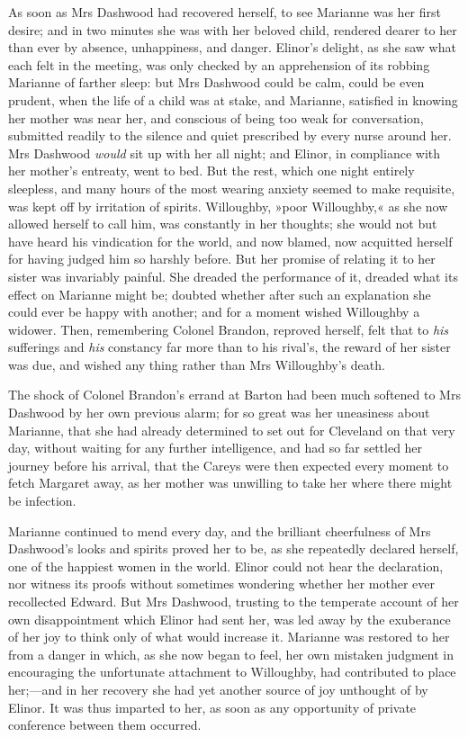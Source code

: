 As soon as Mrs Dashwood had recovered herself, to see Marianne was her first desire; and in two minutes she was with her beloved child, rendered dearer to her than ever by absence, unhappiness, and danger. Elinor’s delight, as she saw what each felt in the meeting, was only checked by an apprehension of its robbing Marianne of farther sleep: but Mrs Dashwood could be calm, could be even prudent, when the life of a child was at stake, and Marianne, satisfied in knowing her mother was near her, and conscious of being too weak for conversation, submitted readily to the silence and quiet prescribed by every nurse around her. Mrs Dashwood \textit{would} sit up with her all night; and Elinor, in compliance with her mother’s entreaty, went to bed. But the rest, which one night entirely sleepless, and many hours of the most wearing anxiety seemed to make requisite, was kept off by irritation of spirits. Willoughby, »poor Willoughby,« as she now allowed herself to call him, was constantly in her thoughts; she would not but have heard his vindication for the world, and now blamed, now acquitted herself for having judged him so harshly before. But her promise of relating it to her sister was invariably painful. She dreaded the performance of it, dreaded what its effect on Marianne might be; doubted whether after such an explanation she could ever be happy with another; and for a moment wished Willoughby a widower. Then, remembering Colonel Brandon, reproved herself, felt that to \textit{his} sufferings and \textit{his} constancy far more than to his rival’s, the reward of her sister was due, and wished any thing rather than Mrs Willoughby’s death.

The shock of Colonel Brandon’s errand at Barton had been much softened to Mrs Dashwood by her own previous alarm; for so great was her uneasiness about Marianne, that she had already determined to set out for Cleveland on that very day, without waiting for any further intelligence, and had so far settled her journey before his arrival, that the Careys were then expected every moment to fetch Margaret away, as her mother was unwilling to take her where there might be infection.

Marianne continued to mend every day, and the brilliant cheerfulness of Mrs Dashwood’s looks and spirits proved her to be, as she repeatedly declared herself, one of the happiest women in the world. Elinor could not hear the declaration, nor witness its proofs without sometimes wondering whether her mother ever recollected Edward. But Mrs Dashwood, trusting to the temperate account of her own disappointment which Elinor had sent her, was led away by the exuberance of her joy to think only of what would increase it. Marianne was restored to her from a danger in which, as she now began to feel, her own mistaken judgment in encouraging the unfortunate attachment to Willoughby, had contributed to place her;—and in her recovery she had yet another source of joy unthought of by Elinor. It was thus imparted to her, as soon as any opportunity of private conference between them occurred.

